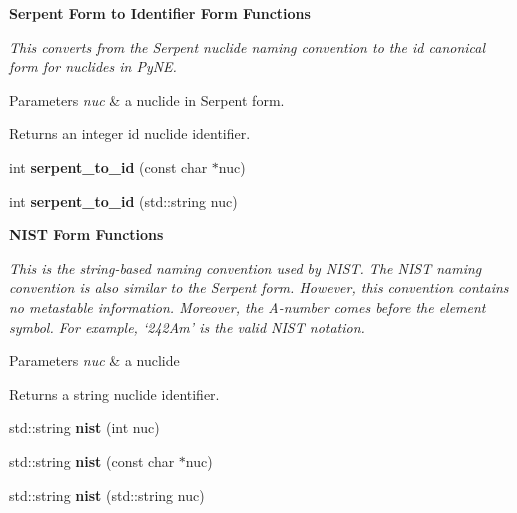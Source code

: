 \begin{Indent}\textbf{ Serpent Form to Identifier Form Functions}\par
{\em This converts from the Serpent nuclide naming convention to the id canonical form for nuclides in Py\+NE. 
\begin{DoxyParams}{Parameters}
{\em nuc} & a nuclide in Serpent form. \\
\hline
\end{DoxyParams}
\begin{DoxyReturn}{Returns}
an integer id nuclide identifier. 
\end{DoxyReturn}
}\begin{DoxyCompactItemize}
\item 
\mbox{\label{namespacepyne_1_1nucname_a9ffbb8149309dd3cb78931c05275fe9d}} 
int {\bfseries serpent\+\_\+to\+\_\+id} (const char $\ast$nuc)
\item 
\mbox{\label{namespacepyne_1_1nucname_a23cb9b915047f2aac156e9c102f96fc7}} 
int {\bfseries serpent\+\_\+to\+\_\+id} (std\+::string nuc)
\end{DoxyCompactItemize}
\end{Indent}
\begin{Indent}\textbf{ N\+I\+ST Form Functions}\par
{\em This is the string-\/based naming convention used by N\+I\+ST. The N\+I\+ST naming convention is also similar to the Serpent form. However, this convention contains no metastable information. Moreover, the A-\/number comes before the element symbol. For example, ‘242\+Am’ is the valid N\+I\+ST notation. 
\begin{DoxyParams}{Parameters}
{\em nuc} & a nuclide \\
\hline
\end{DoxyParams}
\begin{DoxyReturn}{Returns}
a string nuclide identifier. 
\end{DoxyReturn}
}\begin{DoxyCompactItemize}
\item 
\mbox{\label{namespacepyne_1_1nucname_ab7a6f2f0459c253bc311fbbd62e00a38}} 
std\+::string {\bfseries nist} (int nuc)
\item 
\mbox{\label{namespacepyne_1_1nucname_a44a1695692f023e1b6ac104adc11f10b}} 
std\+::string {\bfseries nist} (const char $\ast$nuc)
\item 
\mbox{\label{namespacepyne_1_1nucname_aa4c79af1530cdae7db618209167d17da}} 
std\+::string {\bfseries nist} (std\+::string nuc)
\end{DoxyCompactItemize}
\end{Indent}
